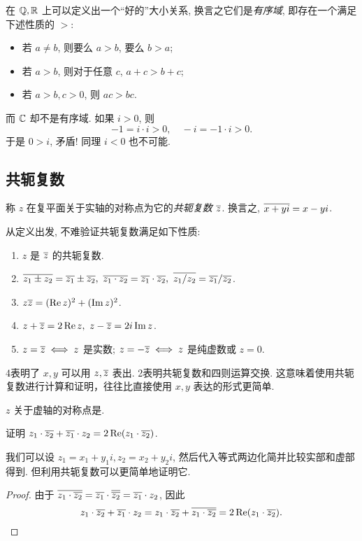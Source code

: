 在 ${\mathbb{Q}},{\mathbb{R}}$ 上可以定义出一个``好的''大小关系,
换言之它们是\emph{有序域}, 即存在一个满足下述性质的 $>$:
\begin{itemize}
  \item 若 $a\neq b$, 则要么 $a>b$, 要么 $b>a$;
  \item 若 $a>b$, 则对于任意 $c$, $a+c>b+c$;
  \item 若 $a>b,c>0$, 则 $ac>bc$.
\end{itemize}
而 \alert{${\mathbb{C}}$ 却不是有序域}.
如果 $i>0$, 则
  \[-1=i\cdot i>0,\quad -i=-1\cdot i>0.\]
于是 $0>i$, 矛盾! 同理 $i<0$ 也不可能.


\subsection{共轭复数}

\begin{definition}[共轭复数]
  称 $z$ 在复平面关于实轴的对称点为它的\emph{共轭复数 $\overline z$}.
换言之, $\overline{x+yi}=x-yi$.
\end{definition}
从定义出发, 不难验证共轭复数满足如下性质:
\begin{enumerate}
  \item $z$ 是 $\overline z$ 的共轭复数.
  \item $\ov{z_1\pm z_2}=\ov{z_1}\pm\ov{z_2},\ 
  \ov{z_1\cdot z_2}=\ov{z_1}\cdot\ov{z_2},\ 
  \ov{z_1/z_2}=\ov{z_1}/\ov{z_2}$.
  \item $z\overline{z}=(\operatorname{Re} z)^2+(\operatorname{Im} z)^2$.
  \item $z+\overline z=2\operatorname{Re} z,\ z-\overline z=2i\operatorname{Im} z$.
  \item $z=\overline z\iff z$ 是实数; $z=-\overline z\iff z$ 是纯虚数或 $z=0$.
\end{enumerate}
\enumnum4表明了 $x,y$ 可以用 $z,\overline z$ 表出.
\enumnum2表明共轭复数和四则运算交换.
这意味着使用共轭复数进行计算和证明，往往比直接使用 $x,y$ 表达的形式更简单.

\begin{exercise}
  $z$ 关于虚轴的对称点是\fillblank{}.
\end{exercise}
\begin{example}
  证明 $z_1\cdot\overline{z_2}+\overline{z_1}\cdot z_2=2\operatorname{Re}(z_1\cdot\overline{z_2})$.
\end{example}
我们可以设 $z_1=x_1+y_1i,z_2=x_2+y_2i$, 然后代入等式两边化简并比较实部和虚部得到.
但利用共轭复数可以更简单地证明它.
\begin{proof}
  由于 $\overline{z_1\cdot\overline{z_2}}=\overline{z_1}\cdot\overline{\overline{z_2}}=\overline{z_1}\cdot z_2$, 因此
    \[z_1\cdot\overline{z_2}+\overline{z_1}\cdot z_2
      =z_1\cdot\overline{z_2}+\overline{z_1\cdot\overline{z_2}}
      =2\operatorname{Re}(z_1\cdot\overline{z_2}).\]
\end{proof}

